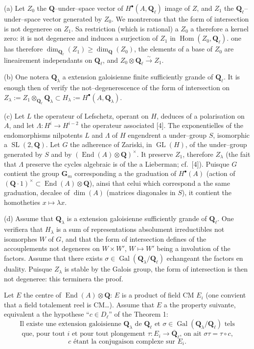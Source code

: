 \documentclass[11pt,a4paper]{article}
\theoremstyle{plain}
\theoremstyle{definition}
\DeclareMathOperator{\Hom}{Hom}
\DeclareMathOperator{\Gal}{Gal}
\DeclareMathOperator{\End}{End}
\DeclareMathOperator{\SL}{SL}
\DeclareMathOperator{\GL}{GL}
\begin{document}
(a) Let $Z_0$ the $\mathbf{Q}$--under--space vector of $H^\bullet(A, \mathbf{Q}_\ell)$ image of $Z$, and $Z_1$ the $\mathbf{Q}_\ell$--under--space vector generated by $Z_0$. We montrerons that the form of intersection is not degeneree on $Z_1$. Sa restriction (which is rational) a $Z_0$ a therefore a kernel zero: it is not degeneree and induces a surjection of $Z_1$ in $\Hom(Z_0, \mathbf{Q}_\ell)$. one has therefore $\dim_{\mathbf{Q}_\ell}(Z_1) \geq \dim_{\mathbf{Q}}(Z_0)$, the elements of a base of $Z_0$ are lineairement independants on $\mathbf{Q}_\ell$, and $Z_0 \otimes \mathbf{Q}_\ell \xrightarrow{\sim} Z_1$.

(b) One notera $\mathbf{Q}_\lambda$ a extension galoisienne finite sufficiently grande of $\mathbf{Q}_\ell$. It is enough then of verify the not--degenerescence of the form of intersection on $Z_\lambda := Z_1 \otimes_{\mathbf{Q}_\ell} \mathbf{Q}_\lambda \subset H_\lambda := H^\bullet(A, \mathbf{Q}_\lambda)$.

(c) Let $L$ the operateur of Lefschetz, operant on $H$, deduces of a polarisation on $A$, and let $\Lambda : H^i \to H^{i-2}$ the operateur associated [4]. The exponentielles of the endomorphisms nilpotents $L$ and $\Lambda$ of $H$ engendrent a under--group $S$, isomorphic a $\SL(2, \mathbf{Q})$. Let $G$ the adherence of Zariski, in $\GL(H)$, of the under--group generated by $S$ and by $(\End(A) \otimes \mathbf{Q})^\times$. It preserve $Z_1$, therefore $Z_\lambda$ (the fait that $\Lambda$ preserve the cycles algebraic is of the a Lieberman; cf.\ [4]). Puisque $G$ contient the group $\mathbf{G}_m$ corresponding a the graduation of $H^\bullet(A)$ (action of $(\mathbf{Q} \cdot 1)^\times \subset \End(A) \otimes \mathbf{Q}$), ainsi that celui which correspond a the same graduation, decalee of $\dim(A)$ (matrices diagonales in $S$), it contient the homotheties $x \mapsto \lambda x$.

(d) Assume that $\mathbf{Q}_\lambda$ is a extension galoisienne sufficiently grande of $\mathbf{Q}_\ell$. One verifiera that $H_\lambda$ is a sum of representations absolument irreductibles not isomorphes $W$ of $G$, and that the form of intersection defines of the accouplements not degeneres on $W \times W'$, $W \mapsto W'$ being a involution of the factors. Assume that there exists $\sigma \in \Gal(\mathbf{Q}_\lambda/\mathbf{Q}_\ell)$ echangeant the factors en duality. Puisque $Z_\lambda$ is stable by the Galois group, the form of intersection is then not degeneree: this terminera the proof.

Let $E$ the centre of $\End(A) \otimes \mathbf{Q}$: $E$ is a product of field CM $E_i$ (one convient that a field totalement reel is CM\ldots). Assume that $E$ a the property suivante, equivalent a the hypothese ``$c \in D_\ell$'' of the Theorem 1:
\begin{equation}\label{eq:hyp}
\text{Il existe une extension galoisienne $\mathbf{Q}_\lambda$ de $\mathbf{Q}_\ell$ et $\sigma \in \Gal(\mathbf{Q}_\lambda/\mathbf{Q}_\ell)$ tels}
\end{equation}
\[
\text{que, pour tout $i$ et pour tout plongement $\tau : E_i \to \overline{\mathbf{Q}}_\ell$, on ait $\sigma\tau = \tau \circ c$,}
\]
\[
c \text{ \'etant la conjugaison complexe sur } E_i .
\]
\end{document}
